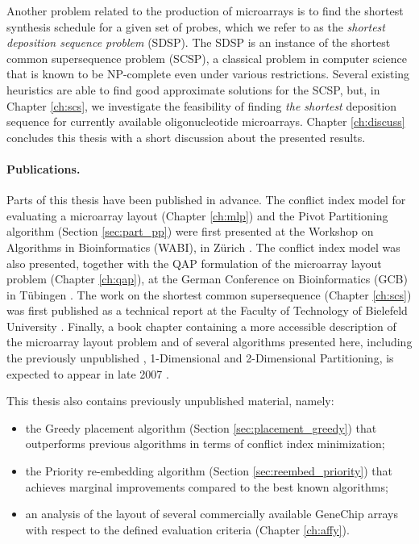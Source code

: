 Another problem related to the production of microarrays is to find the shortest
synthesis schedule for a given set of probes, which we refer to as the
\emph{shortest deposition sequence problem} (SDSP). The SDSP is an instance of
the shortest common supersequence problem (SCSP), a classical problem in
computer science that is known to be NP-complete even under various
restrictions. Several existing heuristics are able to find good approximate
solutions for the SCSP, but, in Chapter \ref{ch:scs}, we investigate the
feasibility of finding \emph{the shortest} deposition sequence for currently
available oligonucleotide microarrays. Chapter \ref{ch:discuss} concludes this
thesis with a short discussion about the presented results.

\paragraph{Publications.}
Parts of this thesis have been published in advance. The conflict index model
for evaluating a microarray layout (Chapter \ref{ch:mlp}) and the Pivot
Partitioning algorithm (Section \ref{sec:part_pp}) were first presented at the
Workshop on Algorithms in Bioinformatics (WABI), in Z\"urich
\citep{Carvalho2006}. The conflict index model was also presented, together with
the QAP formulation of the microarray layout problem (Chapter \ref{ch:qap}), at
the German Conference on Bioinformatics (GCB) in T\"ubingen
\citep{Carvalho2006a}. The work on the shortest common supersequence (Chapter
\ref{ch:scs}) was first published as a technical report at the Faculty of
Technology of Bielefeld University \citep{Carvalho2005}. Finally, a book chapter
containing a more accessible description of the microarray layout problem and of
several algorithms presented here, including the previously unpublished
\Greedyplus, 1-Dimensional and 2-Dimensional Partitioning, is expected to appear
in late 2007 \citep{Carvalho2007}.

This thesis also contains previously unpublished material, namely:
\begin{itemize}
\item the Greedy placement algorithm (Section \ref{sec:placement_greedy}) that
      outperforms previous algorithms in terms of conflict index minimization;
\item the Priority re-embedding algorithm (Section \ref{sec:reembed_priority})
      that achieves marginal improvements compared to the best known algorithms;
\item an analysis of the layout of several commercially available GeneChip
      arrays with respect to the defined evaluation criteria (Chapter
      \ref{ch:affy}).
\end{itemize}


